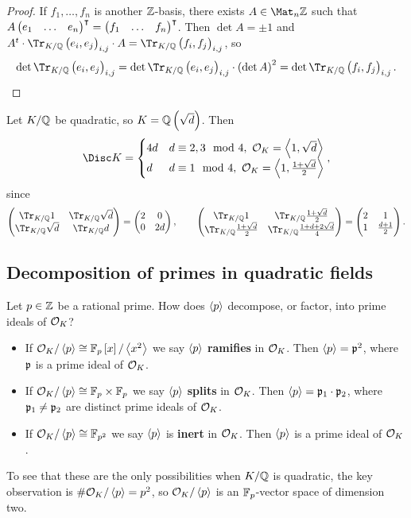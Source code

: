 \begin{proof}
If $ f_1, \dots, f_n $ is another $ \mathbb{Z} $-basis, there exists $ A \in \Mat_n \ZZ $ such that $ A\onebythree{e_1}{\dots}{e_n}^\intercal = \onebythree{f_1}{\dots}{f_n}^\intercal $. Then $ \det A = \pm 1 $ and $ A^t \cdot \Tr_{K / \QQ}\br{e_i, e_j}_{i, j} \cdot A = \Tr_{K / \QQ}\br{f_i, f_j}_{i, j} $, so
$$ \det \Tr_{K / \QQ}\br{e_i, e_j}_{i, j} = \det \Tr_{K / \QQ}\br{e_i, e_j}_{i, j} \cdot \br{\det A}^2 = \det \Tr_{K / \QQ}\br{f_i, f_j}_{i, j}. $$
\end{proof}

\begin{example*}
Let $ K / \mathbb{Q} $ be quadratic, so $ K = \QQ\br{\sqrt{d}} $. Then
$$ \Disc K =
\begin{cases}
4d & d \equiv 2, 3 \mod 4, \ \OOO_K = \abr{1, \sqrt{d}} \\
d & d \equiv 1 \mod 4, \ \OOO_K = \abr{1, \tfrac{1 + \sqrt{d}}{2}}
\end{cases},
$$
since
$$ \twobytwo{\Tr_{K / \QQ} 1}{\Tr_{K / \QQ} \sqrt{d}}{\Tr_{K / \QQ} \sqrt{d}}{\Tr_{K / \QQ} d} = \twobytwo{2}{0}{0}{2d}, \qquad \twobytwo{\Tr_{K / \QQ} 1}{\Tr_{K / \QQ} \tfrac{1 + \sqrt{d}}{2}}{\Tr_{K / \QQ} \tfrac{1 + \sqrt{d}}{2}}{\Tr_{K / \QQ} \tfrac{1 + d + 2\sqrt{d}}{4}} = \twobytwo{2}{1}{1}{\tfrac{d + 1}{2}}. $$
\end{example*}

\subsection{Decomposition of primes in quadratic fields}

Let $ p \in \mathbb{Z} $ be a rational prime. How does $ \left\langle p \right\rangle $ decompose, or factor, into prime ideals of $ \mathcal{O}_K $?
\begin{itemize}
\item If $ \OOO_K / \abr{p} \cong \FF_p\sbr{x} / \abr{x^2} $ we say $ \left\langle p \right\rangle $ \textbf{ramifies} in $ \mathcal{O}_K $. Then $ \left\langle p \right\rangle = \mathfrak{p}^2 $, where $ \mathfrak{p} $ is a prime ideal of $ \mathcal{O}_K $.
\item If $ \mathcal{O}_K / \left\langle p \right\rangle \cong \mathbb{F}_p \times \mathbb{F}_p $ we say $ \left\langle p \right\rangle $ \textbf{splits} in $ \mathcal{O}_K $. Then $ \left\langle p \right\rangle = \mathfrak{p}_1 \cdot \mathfrak{p}_2 $, where $ \mathfrak{p}_1 \ne \mathfrak{p}_2 $ are distinct prime ideals of $ \mathcal{O}_K $.
\item If $ \mathcal{O}_K / \left\langle p \right\rangle \cong \mathbb{F}_{p^2} $ we say $ \left\langle p \right\rangle $ is \textbf{inert} in $ \mathcal{O}_K $. Then $ \left\langle p \right\rangle $ is a prime ideal of $ \mathcal{O}_K $.
\end{itemize}
To see that these are the only possibilities when $ K / \mathbb{Q} $ is quadratic, the key observation is $ \#\mathcal{O}_K / \left\langle p \right\rangle = p^2 $, so $ \mathcal{O}_K / \left\langle p \right\rangle $ is an $ \mathbb{F}_p $-vector space of dimension two.

